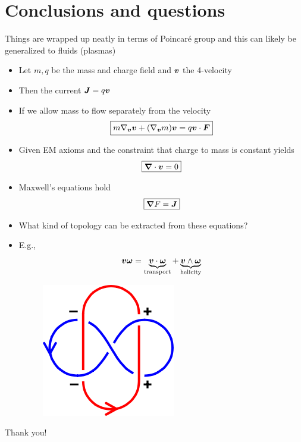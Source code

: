 \documentclass[aspectratio=169]{beamer}
\begin{document}
\section{Conclusions and questions}

\begin{frame}{}
Things are wrapped up neatly in terms of Poincar\'e group and this can likely be generalized to fluids (plasmas)
\vfill
    
    \begin{itemize}
        \item Let $m,q$ be the mass and charge field and $\boldsymbol{v}$ the 4-velocity
        \item Then the current $\boldsymbol{J}=q\boldsymbol{v}$
        \item If we allow mass to flow separately from the velocity 
        \[
        \boxed{m\nabla_{\boldsymbol{v}}\boldsymbol{v} + (\nabla_{\boldsymbol{v}}m)\boldsymbol{v} = q\boldsymbol{v} \cdot \boldsymbol{F}}
        \]
        \item Given EM axioms and the constraint that charge to mass is constant yields
        \[
        \boxed{\boldsymbol{\nabla} \cdot \boldsymbol{v} = 0}
        \]
        \item Maxwell's equations hold
        \[
        \boxed{\boldsymbol{\nabla} F = \boldsymbol{J}}
        \]
    \end{itemize}
    \vfill
\end{frame}

\begin{frame}{}
\vfill
\begin{itemize}
	\item What kind of topology can be extracted from these equations?
	\item E.g., 
	\[
		\boldsymbol{v} \boldsymbol{\omega} = \underbrace{\boldsymbol{v}\cdot \boldsymbol{\omega}}_{\textrm{transport}} + \underbrace{\boldsymbol{v}\wedge \boldsymbol{\omega}}_{\textrm{helicity}}
	\]
	\begin{figure}[H]
		\centering
		\includegraphics[width=.2\textwidth]{figures/gauss_linking.png}
	\end{figure}
\end{itemize}
\vfill
\end{frame}

\begin{frame}{}
\vfill
\huge \centering Thank you!
\vfill 
\end{frame}
\end{document}
